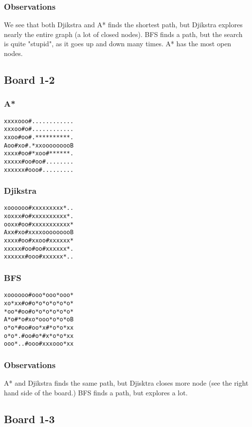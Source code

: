 \documentclass[11pt,a4paper]{article}
\begin{document}
\subsubsection*{Observations}
We see that both Djikstra and A* finds the shortest path, but Djikstra explores nearly the entire graph (a lot of closed nodes). BFS finds a path, but the search is quite "stupid", as it goes up and down many times. 
A* has the most open nodes. 


\subsection*{Board 1-2}
\subsubsection*{A*}
\begin{lstlisting}
xxxxooo#............
xxxoo#o#............
xxoo#oo#.**********.
Aoo#xo#.*xxooooooooB
xxxx#oo#*xoo#******.
xxxxx#oo#oo#........
xxxxxx#ooo#.........
\end{lstlisting}

\subsubsection*{Djikstra}
\begin{lstlisting}
xoooooo#xxxxxxxxx*..
xoxxx#o#xxxxxxxxxx*.
ooxx#oo#xxxxxxxxxxx*
Axx#xo#xxxxooooooooB
xxxx#oo#xxoo#xxxxxx*
xxxxx#oo#oo#xxxxxx*.
xxxxxx#ooo#xxxxxx*..
\end{lstlisting}

\subsubsection*{BFS}
\begin{lstlisting}
xoooooo#ooo*ooo*ooo*
xo*xx#o#o*o*o*o*o*o*
*oo*#oo#o*o*o*o*o*o*
A*o#*o#xo*ooo*o*o*oB
o*o*#oo#oo*x#*o*o*xx
o*o*.#oo#o*#x*o*o*xx
ooo*..#ooo#xxxooo*xx
\end{lstlisting}

\subsubsection*{Observations}
A* and Djikstra finds the same path, but Djisktra closes more node (see the right hand side of the board.) BFS finds a path, but explores a lot.

\subsection*{Board 1-3}
\end{document}
